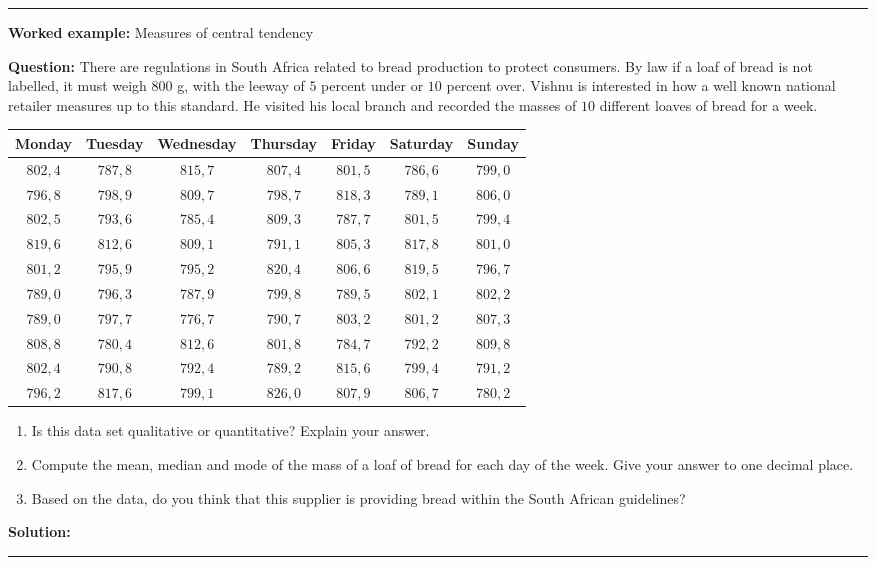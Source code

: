 \documentclass[a4paper,11pt]{report}
\newenvironment{wex}[3]%
{\rule{\linewidth}{0.5mm}
\textbf{Worked example:} #1

\textbf{Question:} #2

\textbf{Solution:} #3}%
{\rule{\linewidth}{0.5mm}}
\begin{document}
\begin{wex}{Measures of central tendency}{
    There are regulations in South Africa related to bread production
    to protect consumers. By law if a loaf of bread is not labelled,
    it must weigh $800$ g, with the leeway of $5$ percent under or $10$
    percent over.  Vishnu is interested in how a well known national
    retailer measures up to this standard. He visited his local branch
    and recorded the masses of $10$ different loaves of bread for a
    week.

    \begin{center}
      \begin{tabular}{ccccccc}
        \toprule
        Monday & Tuesday & Wednesday & Thursday & Friday & Saturday & Sunday \\
        \midrule
        $802,4$ & $787,8$ & $815,7$ & $807,4$ & $801,5$ & $786,6$ & $799,0$ \\
        $796,8$ & $798,9$ & $809,7$ & $798,7$ & $818,3$ & $789,1$ & $806,0$ \\
        $802,5$ & $793,6$ & $785,4$ & $809,3$ & $787,7$ & $801,5$ & $799,4$ \\
        $819,6$ & $812,6$ & $809,1$ & $791,1$ & $805,3$ & $817,8$ & $801,0$ \\
        $801,2$ & $795,9$ & $795,2$ & $820,4$ & $806,6$ & $819,5$ & $796,7$ \\
        $789,0$ & $796,3$ & $787,9$ & $799,8$ & $789,5$ & $802,1$ & $802,2$ \\
        $789,0$ & $797,7$ & $776,7$ & $790,7$ & $803,2$ & $801,2$ & $807,3$ \\
        $808,8$ & $780,4$ & $812,6$ & $801,8$ & $784,7$ & $792,2$ & $809,8$ \\
        $802,4$ & $790,8$ & $792,4$ & $789,2$ & $815,6$ & $799,4$ & $791,2$ \\
        $796,2$ & $817,6$ & $799,1$ & $826,0$ & $807,9$ & $806,7$ & $780,2$ \\
        \bottomrule
      \end{tabular}
    \end{center}

    \begin{enumerate}
    \item Is this data set qualitative or quantitative? Explain your
      answer.
    \item Compute the mean, median and mode of the mass of a loaf of bread
      for each day of the week. Give your answer to one decimal place.
    \item Based on the data, do you think that this supplier is
      providing bread within the South African guidelines?
    \end{enumerate}
}{

}
\end{wex}
\end{document}
